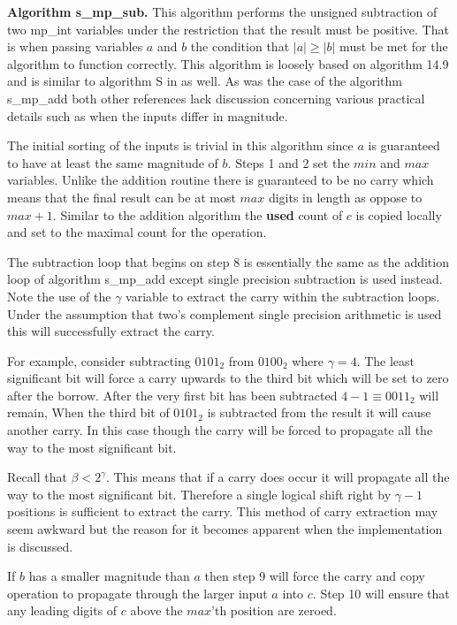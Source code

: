 \documentclass[b5paper]{book}
\begin{document}
\textbf{Algorithm s\_mp\_sub.}
This algorithm performs the unsigned subtraction of two mp\_int variables under the restriction that the result must be positive.  That is when
passing variables $a$ and $b$ the condition that $\vert a \vert \ge \vert b \vert$ must be met for the algorithm to function correctly.  This
algorithm is loosely based on algorithm 14.9 \cite[pp. 595]{HAC} and is similar to algorithm S in \cite[pp. 267]{TAOCPV2} as well.  As was the case
of the algorithm s\_mp\_add both other references lack discussion concerning various practical details such as when the inputs differ in magnitude.

The initial sorting of the inputs is trivial in this algorithm since $a$ is guaranteed to have at least the same magnitude of $b$.  Steps 1 and 2 
set the $min$ and $max$ variables.  Unlike the addition routine there is guaranteed to be no carry which means that the final result can be at 
most $max$ digits in length as oppose to $max + 1$.  Similar to the addition algorithm the \textbf{used} count of $c$ is copied locally and 
set to the maximal count for the operation.

The subtraction loop that begins on step 8 is essentially the same as the addition loop of algorithm s\_mp\_add except single precision 
subtraction is used instead.  Note the use of the $\gamma$ variable to extract the carry within the subtraction loops.  Under the assumption
that two's complement single precision arithmetic is used this will successfully extract the carry.  

For example, consider subtracting $0101_2$ from
$0100_2$ where $\gamma = 4$.  The least significant bit will force a carry upwards to the third bit which will be set to zero after the borrow.  After
the very first bit has been subtracted $4 - 1 \equiv 0011_2$ will remain,  When the third bit of $0101_2$ is subtracted from the result it will cause
another carry.  In this case though the carry will be forced to propagate all the way to the most significant bit.  

Recall that $\beta < 2^{\gamma}$.  This means that if a carry does occur it will propagate all the way to the most significant bit.  Therefore a single
logical shift right by $\gamma - 1$ positions is sufficient to extract the carry.  This method of carry extraction may seem awkward but the reason for 
it becomes apparent when the implementation is discussed.  

If $b$ has a smaller magnitude than $a$ then step 9 will force the carry and copy operation to propagate through the larger input $a$ into $c$.  Step
10 will ensure that any leading digits of $c$ above the $max$'th position are zeroed.
\end{document}
